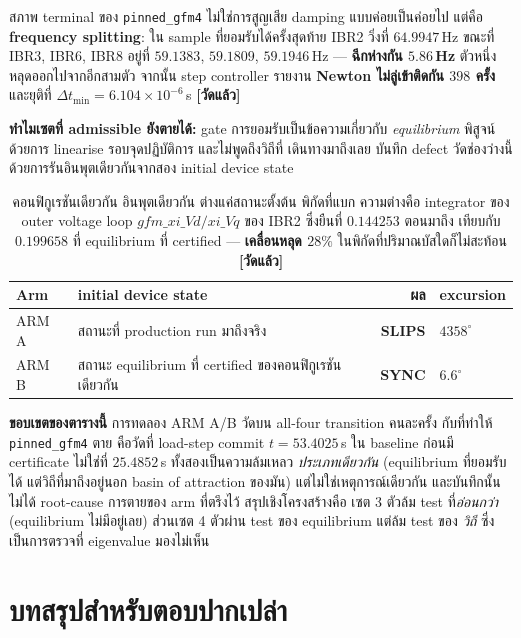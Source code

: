 \documentclass[11pt,a4paper]{article}
\newcommand{\code}[1]{\texttt{\small #1}}
\newcommand{\mes}{\textcolor{ok}{\textbf{[วัดแล้ว]}}}
\begin{document}
\noindent
สภาพ terminal ของ \code{pinned\_gfm4} ไม่ใช่การสูญเสีย damping แบบค่อยเป็นค่อยไป
แต่คือ \textbf{frequency splitting}: ใน sample ที่ยอมรับได้ครั้งสุดท้าย IBR2
วิ่งที่ $64.9947$\,Hz ขณะที่ IBR3, IBR6, IBR8 อยู่ที่ $59.1383$, $59.1809$,
$59.1946$\,Hz --- \textbf{ฉีกห่างกัน $5.86$\,Hz} ตัวหนึ่งหลุดออกไปจากอีกสามตัว
จากนั้น step controller รายงาน \textbf{Newton ไม่ลู่เข้าติดกัน $398$ ครั้ง}
และยุติที่ $\Delta t_{\min} = 6.104\times10^{-6}$\,s \mes

\textbf{ทำไมเซตที่ admissible ยังตายได้:} gate การยอมรับเป็นข้อความเกี่ยวกับ
\emph{equilibrium} พิสูจน์ด้วยการ linearise รอบจุดปฏิบัติการ และไม่พูดถึงวิถีที่
เดินทางมาถึงเลย บันทึก defect วัดช่องว่างนี้ด้วยการรันอินพุตเดียวกันจากสอง
initial device state

\begin{table}[H]
\centering\small
\begin{tabular}{@{}llrl@{}}
\toprule
\textbf{Arm} & \textbf{initial device state} & \textbf{ผล} & \textbf{excursion}\\
\midrule
ARM A & สถานะที่ production run มาถึงจริง & \textcolor{no}{\textbf{SLIPS}} & $4358^{\circ}$\\
ARM B & สถานะ equilibrium ที่ certified ของคอนฟิกูเรชันเดียวกัน & \textbf{SYNC} & $6.6^{\circ}$\\
\bottomrule
\end{tabular}
\caption{คอนฟิกูเรชันเดียวกัน อินพุตเดียวกัน ต่างแค่สถานะตั้งต้น พิกัดที่แบก
ความต่างคือ integrator ของ outer voltage loop $gfm\_xi\_Vd/xi\_Vq$ ของ IBR2
ซึ่งยืนที่ $0.144253$ ตอนมาถึง เทียบกับ $0.199658$ ที่ equilibrium ที่ certified
--- \textbf{เคลื่อนหลุด $28\%$} ในพิกัดที่ปริมาณบัสใดก็ไม่สะท้อน \mes}
\end{table}

\noindent
\textbf{ขอบเขตของตารางนี้} การทดลอง ARM A/B วัดบน all-four transition คนละครั้ง
กับที่ทำให้ \code{pinned\_gfm4} ตาย คือวัดที่ load-step commit $t = 53.4025$\,s
ใน baseline ก่อนมี certificate ไม่ใช่ที่ $25.4852$\,s ทั้งสองเป็นความล้มเหลว
\emph{ประเภทเดียวกัน} (equilibrium ที่ยอมรับได้ แต่วิถีที่มาถึงอยู่นอก basin of
attraction ของมัน) แต่ไม่ใช่เหตุการณ์เดียวกัน และบันทึกนั้นไม่ได้ root-cause
การตายของ arm ที่ตรึงไว้ สรุปเชิงโครงสร้างคือ เซต 3 ตัวล้ม test ที่\emph{อ่อนกว่า}
(equilibrium ไม่มีอยู่เลย) ส่วนเซต 4 ตัวผ่าน test ของ equilibrium แต่ล้ม test ของ
\emph{วิถี} ซึ่งเป็นการตรวจที่ eigenvalue มองไม่เห็น

\section{บทสรุปสำหรับตอบปากเปล่า}
\end{document}
